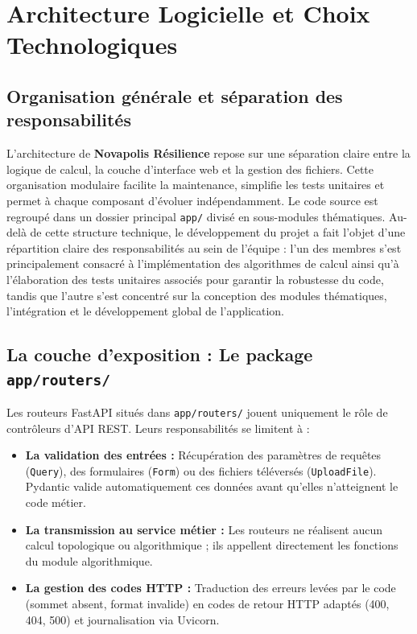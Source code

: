\section{Architecture Logicielle et Choix Technologiques}

\subsection{Organisation générale et séparation des responsabilités}
L’architecture de \textbf{Novapolis Résilience} repose sur une séparation claire entre la logique de calcul, la couche d’interface web et la gestion des fichiers. Cette organisation modulaire facilite la maintenance, simplifie les tests unitaires et permet à chaque composant d’évoluer indépendamment. Le code source est regroupé dans un dossier principal \texttt{app/} divisé en sous-modules thématiques.
Au-delà de cette structure technique, le développement du projet a fait l'objet d'une répartition claire des responsabilités au sein de l'équipe : l'un des membres s'est principalement consacré à l'implémentation des algorithmes de calcul ainsi qu'à l'élaboration des tests unitaires associés pour garantir la robustesse du code, tandis que l'autre s'est concentré sur la conception des modules thématiques, l'intégration et le développement global de l'application.
\subsection{La couche d'exposition : Le package \texttt{app/routers/}}
Les routeurs FastAPI situés dans \texttt{app/routers/} jouent uniquement le rôle de contrôleurs d'API REST. Leurs responsabilités se limitent à :
\begin{itemize}
    \item \textbf{La validation des entrées :} Récupération des paramètres de requêtes (\texttt{Query}), des formulaires (\texttt{Form}) ou des fichiers téléversés (\texttt{UploadFile}). Pydantic valide automatiquement ces données avant qu'elles n'atteignent le code métier.
    \item \textbf{La transmission au service métier :} Les routeurs ne réalisent aucun calcul topologique ou algorithmique ; ils appellent directement les fonctions du module algorithmique.
    \item \textbf{La gestion des codes HTTP :} Traduction des erreurs levées par le code (sommet absent, format invalide) en codes de retour HTTP adaptés (400, 404, 500) et journalisation via Uvicorn.
\end{itemize}

